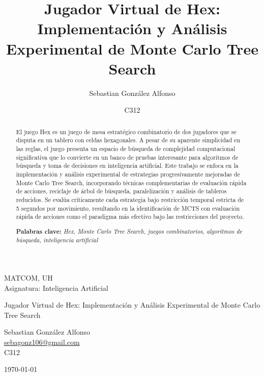 \documentclass[12pt]{article}
\title{Jugador Virtual de Hex: Implementación y Análisis Experimental de Monte Carlo Tree Search}
\author{Sebastian González Alfonso}
\date{C312}
\begin{document}
\begin{titlepage}
\centering
\vspace*{\fill}

{\LARGE MATCOM, UH \\
Asignatura: Inteligencia Artificial \\}

\vspace{2cm}

{\Huge Jugador Virtual de Hex: Implementación y Análisis Experimental de Monte Carlo Tree Search}

\vspace{1.5cm}

{\large Sebastian González Alfonso \\
		\href{sebagonz106@gmail.com}{sebagonz106@gmail.com} \\
C312}

\vspace{2cm}

{\large \today}

\vspace*{\fill}
\end{titlepage}

\begin{abstract}

	El juego Hex es un juego de mesa estratégico combinatorio de dos jugadores que se disputa en un tablero con celdas hexagonales. A pesar de su aparente simplicidad en las reglas, el juego presenta un espacio de búsqueda de complejidad computacional significativa que lo convierte en un banco de pruebas interesante para algoritmos de búsqueda y toma de decisiones en inteligencia artificial. Este trabajo se enfoca en la implementación y análisis experimental de estrategias progresivamente mejoradas de Monte Carlo Tree Search, incorporando técnicas complementarias de evaluación rápida de acciones, reciclaje de árbol de búsqueda, paralelización y análisis de tableros reducidos. Se evalúa críticamente cada estrategia bajo restricción temporal estricta de 5 segundos por movimiento, resultando en la identificación de MCTS con evaluación rápida de acciones como el paradigma más efectivo bajo las restricciones del proyecto.

	\textbf{Palabras clave:}  \textit{Hex, Monte Carlo Tree Search, juegos combinatorios, algoritmos de búsqueda, inteligencia artificial}
\end{abstract}
\end{document}
